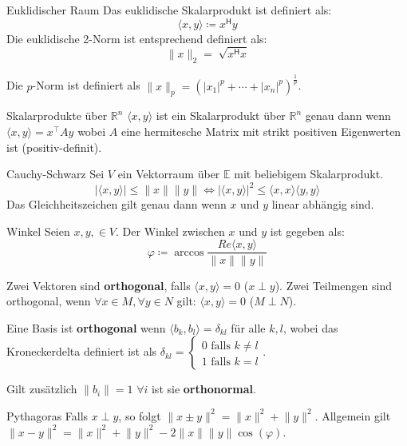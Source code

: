 \documentclass[a4paper,10pt]{article}
\newcommand*{\hermconj}{\mathsf{H}}
\def\R{\mathbb{R}}
\begin{document}
\begin{subbox}{Euklidischer Raum}
  Das euklidische Skalarprodukt ist definiert als: $$\langle x, y \rangle \coloneqq x^\hermconj y$$
  Die euklidische 2-Norm ist entsprechend definiert als: $$\lVert x \rVert_2 = \sqrt[]{x^\hermconj x}$$
\end{subbox}

Die $p$-Norm ist definiert als $\lVert x \rVert_p = (|x_1|^p + \cdots + |x_n|^p)^{\frac{1}{p}}$.

\begin{subbox}{Skalarprodukte über $\R^n$}
  $\langle x, y \rangle$ ist ein Skalarprodukt über $\R^n$ genau dann wenn $\langle x, y \rangle = x^\top A y$ wobei $A$ eine hermitesche Matrix mit strikt positiven Eigenwerten ist (positiv-definit).
\end{subbox}

\begin{mainbox}{Cauchy-Schwarz}
  Sei $V$ ein Vektorraum über $\mathbb{E}$ mit beliebigem Skalarprodukt.
  $$| \langle x, y \rangle | \leq \lVert x \rVert \lVert y \rVert \iff | \langle x, y \rangle |^2 \leq \langle x, x \rangle \langle y, y \rangle$$
  Das Gleichheitszeichen gilt genau dann wenn $x$ und $y$ linear abhängig sind.
\end{mainbox}

\begin{subbox}{Winkel}
  Seien $x, y, \in V$. Der Winkel zwischen $x$ und $y$ ist gegeben als:
  $$\varphi \coloneqq \arccos \frac{Re \langle x, y \rangle}{\lVert x \rVert \lVert y \rVert}$$
\end{subbox}

Zwei Vektoren sind \textbf{orthogonal}, falls $\langle x, y \rangle = 0$ ($x \perp y$). Zwei Teilmengen sind orthogonal, wenn $\forall x \in M, \forall y \in N$ gilt: $\langle x, y \rangle = 0$ ($M \perp N$).

Eine Basis ist \textbf{orthogonal} wenn $\langle b_k, b_l \rangle = \delta_{kl}$ für alle $k, l$, wobei das Kroneckerdelta definiert ist als
$\delta_{kl} = \begin{cases}
  0\text{ falls }k \neq l \\
  1\text{ falls }k = l
\end{cases}$.

Gilt zusätzlich $\lVert b_i \rVert = 1$ $\forall i$ ist sie \textbf{orthonormal}.

\begin{subbox}{Pythagoras}
  Falls $x \perp y$, so folgt $\lVert x \pm y \rVert^2 = \lVert x \rVert^2 + \lVert y \rVert^2$. Allgemein gilt $\lVert x - y \rVert^2 = \lVert x \rVert^2 + \lVert y \rVert^2 - 2 \lVert x \rVert \lVert y \rVert \cos (\varphi)$.
\end{subbox}
\end{document}
